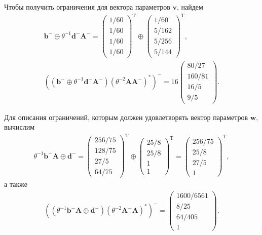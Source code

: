 \documentclass[specialist,
               substylefile = spbu.rtx,
               subf,href,colorlinks=true, 12pt]{disser}
\DeclareMathOperator{\T}{T}
\theoremstyle{definition}
\begin{document}
Чтобы получить ограничения для вектора параметров $\bm{v}$, найдем
\begin{gather*}
\bm{b}^{-}\oplus\theta^{-1}\bm{d}^{-}\bm{A}^{-}
=
\begin{pmatrix}
1/60\\
1/60\\
1/60\\
1/60
\end{pmatrix}^{\T}
\oplus
\begin{pmatrix}
1/60\\
5/162\\
5/256\\
5/144
\end{pmatrix}^{\T},
\\
((\bm{b}^{-}\oplus\theta^{-1}\bm{d}^{-}\bm{A}^{-})
(\theta^{-2}\bm{A}\bm{A}^{-})^{\ast})^{-}
=16
\begin{pmatrix}
80/27\\
160/81\\16/5\\9/5
\end{pmatrix}.
\end{gather*}

Для описания ограничений, которым должен удовлетворять вектор параметров $\bm{w}$, вычислим
\begin{gather*}
\theta^{-1}\bm{b}^{-}\bm{A}
\oplus
\bm{d}^{-}
=
\begin{pmatrix}
256/75\\128/75\\27/5\\64/75
\end{pmatrix}^{\T}
\oplus
\begin{pmatrix}
25/8\\25/8\\1\\1
\end{pmatrix}^{\T}
=
\begin{pmatrix}
256/75\\25/8\\27/5\\1
\end{pmatrix}^{\T},
\end{gather*}
а также
\begin{gather*}
((\theta^{-1}\bm{b}^{-}\bm{A}
\oplus
\bm{d}^{-})
(\theta^{-2}\bm{A}^{-}\bm{A})^{\ast})^{-}
=
\begin{pmatrix}
1600/6561\\8/25\\64/405\\1
\end{pmatrix}.
\end{gather*} 
 
\end{document}

